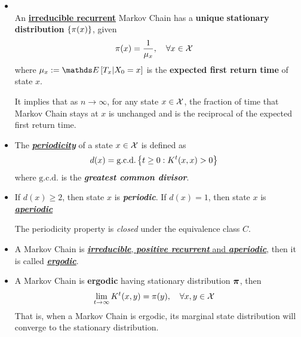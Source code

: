 \documentclass[11pt]{article}
\begin{document}
\begin{itemize}
\item \begin{theorem} \citep{ross2014introduction}\\
An \underline{\textbf{irreducible recurrent}} Markov Chain has a \textbf{unique} \textbf{stationary distribution} $\left\{\pi(x)\right\}$, given 
\begin{align}
\pi(x) &= \frac{1}{\mu_x}, \quad \forall x\in {\mathcal X}
\end{align} where $\mu_{x} := \E{}{T_{x} | X_{0} = x}$  is the \textbf{expected first return time} of state $x$.
\end{theorem} It implies that as $n\rightarrow \infty$, for any state $x\in {\mathcal X}$, the fraction of time that Markov Chain stays at $x$ is unchanged and is the reciprocal of the expected first return time.

\item \begin{definition}
The \underline{\textbf{\emph{periodicity}}} of a state $x \in {\mathcal X}$ is defined as 
\begin{align}
d(x) &= \text{g.c.d.}\left\{t\ge 0: K^{t}(x, x) > 0\right\}
\end{align} where $\text{g.c.d.}$ is the \emph{\textbf{greatest common divisor}}. 
\end{definition}

\item \begin{definition}
If $d(x) \ge 2$, then state $x$ is \emph{\textbf{periodic}}. If $d(x) = 1$, then state $x$ is \underline{\emph{\textbf{aperiodic}}}
\end{definition}
The periodicity property is \emph{closed} under the equivalence class $C$.

\item \begin{definition}
A Markov Chain is  \underline{\emph{\textbf{irreducible}}, \emph{\textbf{positive recurrent}} and \emph{\textbf{aperiodic}}}, then it is called \underline{\emph{\textbf{ergodic}}}.
\end{definition}

\item \begin{theorem}
A Markov Chain is \textbf{ergodic} having stationary distribution $\boldsymbol{\pi}$, then 
\begin{align}
\lim_{t\rightarrow \infty}K^{t}(x, y) &= \pi(y), \quad \forall x, y\in {\mathcal X} \label{eqn: mc_ergodic}
\end{align} That is, when a Markov Chain is ergodic, its marginal state distribution will converge to the stationary distribution.
\end{theorem}


\end{itemize}
\end{document}
